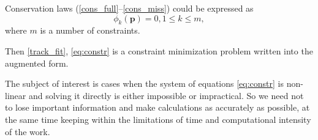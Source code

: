 %


Conservation laws (\ref{cons_full}--\ref{cons_miss}) could be expressed as
\begin{equation}
\label{eq:constr}
\phi_k(\boldsymbol{p}) = 0, 1 \leqslant k  \leqslant m,
\end{equation}
where $m$ is a number of constraints.

Then \eqref{track_fit}, \eqref{eq:constr} is a constraint minimization problem written into the augmented form.

The subject of interest is cases when the system of equations \eqref{eq:constr} is non-linear and solving it directly is either impossible or impractical. %
So we need not to lose important information and make calculations as accurately as possible, at the same time keeping within the limitations of time and computational intensity of the work.
